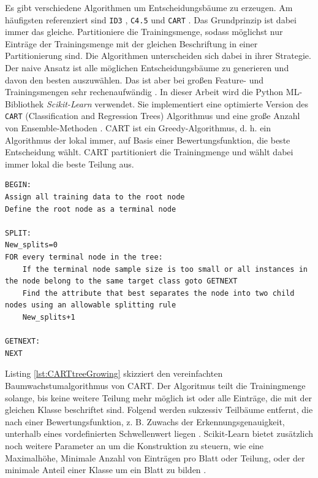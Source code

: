 \newline
\newline
Es gibt verschiedene Algorithmen um Entscheidungsbäume zu erzeugen. Am häufigsten referenziert sind \texttt{ID3} \cite{quinlan1986induction}, \texttt{C4.5} \cite{quinlan2014c4}
und \texttt{CART} \cite{breiman1984classification}. Das Grundprinzip ist dabei immer das gleiche. Partitioniere die Trainingsmenge, sodass möglichst nur Einträge der Trainingsmenge mit der
gleichen Beschriftung in einer Partitionierung sind. Die Algorithmen unterscheiden sich dabei in ihrer Strategie. Der naive Ansatz ist alle möglichen Entscheidungsbäume zu generieren und davon den
besten auszuwählen. Das ist aber bei großen Feature- und Trainingsmengen sehr rechenaufwändig \cite{quinlan1986induction}.
\newline
\newline
In dieser Arbeit wird die Python ML-Bibliothek \textit{Scikit-Learn} verwendet. Sie implementiert eine optimierte Version des \texttt{CART} (Classification and Regression Trees) Algorithmus \cite{ScikitLearnCART}
und eine große Anzahl von Ensemble-Methoden \cite{scikit-learn}.
\newline
\newline
CART ist ein Greedy-Algorithmus, d. h. ein Algorithmus der lokal immer, auf Basis einer Bewertungsfunktion, die beste Entscheidung wählt.
CART partitioniert die Trainingmenge und wählt dabei immer lokal die beste Teilung aus.
\begin{lstlisting}[label=lst:CARTtreeGrowing,caption={Skizze von vereinfachten Baumwachstumsalgorithmus \cite{steinbergCART}.}]
BEGIN:
Assign all training data to the root node
Define the root node as a terminal node

SPLIT:
New_splits=0
FOR every terminal node in the tree:
    If the terminal node sample size is too small or all instances in the node belong to the same target class goto GETNEXT
    Find the attribute that best separates the node into two child nodes using an allowable splitting rule
    New_splits+1

GETNEXT:
NEXT
\end{lstlisting}
Listing \ref{lst:CARTtreeGrowing} skizziert den vereinfachten Baumwachstumalgorithmus von CART. Der Algoritmus teilt die Trainingmenge solange, bis keine weitere Teilung mehr möglich ist oder alle Einträge, die
mit der gleichen Klasse beschriftet sind. Folgend werden sukzessiv Teilbäume entfernt, die nach einer Bewertungsfunktion, z. B. Zuwachs der Erkennungsgenauigkeit, unterhalb eines vordefinierten
Schwellenwert liegen \cite{steinbergCART}.
\newline
\newline
Scikit-Learn bietet zusätzlich noch weitere Parameter an um die Konstruktion zu steuern, wie eine Maximalhöhe, Minimale Anzahl von Einträgen pro Blatt oder Teilung, oder der minimale Anteil einer Klasse
um ein Blatt zu bilden \cite{ScikitLearnDTC}.